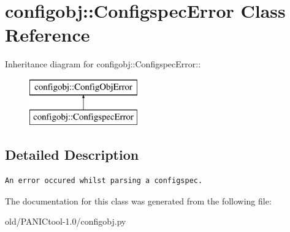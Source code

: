 \section{configobj::Configspec\-Error Class Reference}
\label{classconfigobj_1_1ConfigspecError}
Inheritance diagram for configobj::Configspec\-Error::\begin{figure}[H]
\begin{center}
\leavevmode
\includegraphics[height=2cm]{classconfigobj_1_1ConfigspecError}
\end{center}
\end{figure}


\subsection{Detailed Description}


\footnotesize\begin{verbatim}
An error occured whilst parsing a configspec.
\end{verbatim}
\normalsize
 



The documentation for this class was generated from the following file:\begin{CompactItemize}
\item 
old/PANICtool-1.0/configobj.py\end{CompactItemize}
